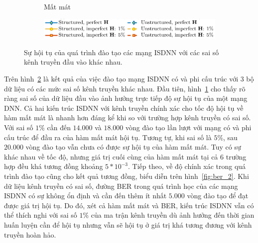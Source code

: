 \begin{figure}[ht]
\begin{subfigure}[b]{0.48\textwidth}
        \caption{Mất mát}
        \label{fig:loss_2}
    \end{subfigure}
    \hfill
    \begin{subfigure}{\linewidth}
        \centering
        \includegraphics[width=.8\linewidth]{figures/lg_performance_21.pdf}
    \end{subfigure}
    \caption{Sự hội tụ của quá trình đào tạo các mạng ISDNN với các sai số kênh truyền đầu vào khác nhau.}
    \label{fig:training_2}
\end{figure}

Trên hình~\ref{fig:training_2} là kết quả của việc đào tạo mạng ISDNN có và phi cấu trúc với $3$ bộ dữ liệu có các mức sai số kênh truyền khác nhau. Đầu tiên, hình~\ref{fig:loss_2} cho thấy rõ ràng sai số của dữ liệu đầu vào ảnh hưởng trực tiếp độ sự hội tụ của một mạng DNN. 
Cả hai kiến trúc ISDNN với kênh truyền chính xác cho tốc độ hội tụ về hàm mất mát là nhanh hơn đáng kể khi so với trường hợp kênh truyền có sai số. Với sai số $1$\% cần đến $14.000$ và $18.000$ vòng đào tạo lần lượt với mạng có và phi cấu trúc để đầu ra của hàm mất mát hội tụ. Tương tự, khi sai số là $5$\%, sau $20.000$ vòng đào tạo vẫn chưa có được sự hội tụ của hàm mất mát. Tuy có sự khác nhau về tốc độ, nhưng giá trị cuối cùng của hàm mất mát tại cả $6$ trường hợp đều khá tương đồng khoảng $5*10^{-3}$.
Tiếp theo, về độ chính xác trong quá trình đào tạo cũng cho kết quả tương đồng, biểu diễn trên hình~\ref{fig:ber_2}. Khi dữ liệu kênh truyền có sai số, đường BER trong quá trình học của các mạng ISDNN có sự không ổn định và cần đến thêm ít nhất $5.000$ vòng đào tạo để đạt được giá trị hội tụ. 
Do đó, xét cả hàm mất mát và BER, kiến trúc ISDNN vẫn có thể thích nghi với sai số $1$\% của ma trận kênh truyền dù ảnh hưởng đến thời gian huấn luyện cần để hội tụ nhưng vẫn sẽ hội tụ ở giá trị khá tương đương với kênh truyền hoàn hảo. 
